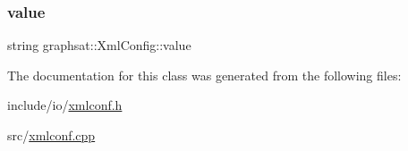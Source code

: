 \subsubsection{\texorpdfstring{value}{value}}
{\footnotesize\ttfamily string graphsat\+::\+Xml\+Config\+::value\hspace{0.3cm}{\ttfamily [private]}}



The documentation for this class was generated from the following files\+:\begin{DoxyCompactItemize}
\item 
include/io/\mbox{\hyperlink{xmlconf_8h}{xmlconf.\+h}}\item 
src/\mbox{\hyperlink{xmlconf_8cpp}{xmlconf.\+cpp}}\end{DoxyCompactItemize}
